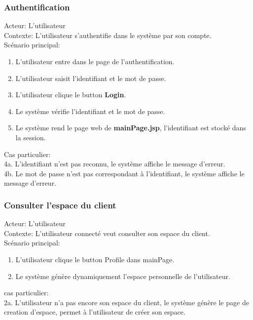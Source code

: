 \documentclass[14px]{article}
\begin{document}
\subsubsection{Authentification}
Acteur: L'utilisateur\\
Contexte: L'utilisateur s'authentifie dans le système par son compte.\\
Scénario principal:
\begin{enumerate}
	\item L'utilisateur entre dans le page de l'authentification.
	\item L'utilisateur saisit l'identifiant et le mot de passe.
	\item L'utilisateur clique le button \textbf{Login}.
	\item Le système vérifie l'identifiant et le mot de passe.
	\item Le système rend le page web de \textbf{mainPage.jsp}, l'identifiant est stocké dans la session.
\end{enumerate}
Cas particulier: \\
4a. L'identifiant n'est pas reconnu, le système affiche le message d'erreur.\\
4b. Le mot de passe n'est pas correspondant à l'identifiant, le système affiche le message d'erreur.

\subsubsection{Consulter l'espace du client}
Acteur: L'utilisateur\\
Contexte: L'utilisateur connecté veut consulter son espace du client.\\
Scénario principal:
\begin{enumerate}
	\item L'utilisateur clique le button Profile dans mainPage.
	\item Le système génère dynamiquement l'espace personnelle de l'utilisateur.
\end{enumerate}
cas particulier:\\
2a. L'utilisateur n'a pas encore son espace du client, le système génère le page de creation d'espace, permet à l'utilisateur de créer son espace.
\end{document}

